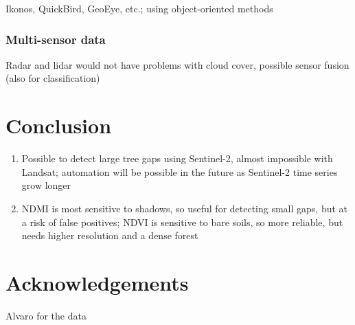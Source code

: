 \documentclass[a4paper,12pt]{scrbook}
\begin{document}
Ikonos, QuickBird, GeoEye, etc.; using object-oriented methods

\subsection{Multi-sensor data}

Radar and lidar would not have problems with cloud cover, possible sensor fusion (also for classification)

\chapter{Conclusion}

\begin{enumerate}
 \item Possible to detect large tree gaps using Sentinel-2, almost impossible with Landsat; automation will be possible in the future as Sentinel-2 time series grow longer
 \item \ac{NDMI} is most sensitive to shadows, so useful for detecting small gaps, but at a risk of false positives; \ac{NDVI} is sensitive to bare soils, so more reliable, but needs higher resolution and a dense forest
\end{enumerate}

\chapter{Acknowledgements}

Alvaro for the data

\printnoidxglossary[type=acronym]


\end{document}
